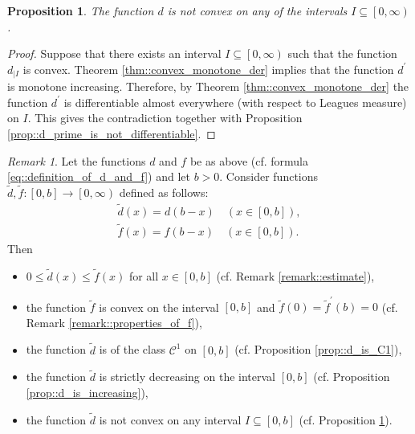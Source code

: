 \documentclass[12pt]{article}
\renewcommand{\leq}{\leqslant}
\newcommand{\ContClass}{\mathcal{C}}
\newcommand{\paren}[1]{\! \left( #1 \right) }
\newcommand{\bracket}[1]{\! \left[ #1 \right] }  %
\newcommand{\displayendfileinfo}{}
\theoremstyle{plain}
\newtheorem{proposition}[theorem]{Proposition}
\theoremstyle{definition}
\theoremstyle{remark}
\newtheorem{remark}[theorem]{Remark}
\begin{document}
\begin{proposition} \label{d_is_non_convex_on_any_interval}
    The function $d$ is not convex on any of the intervals $I \subseteq \left[0, \infty \right)$.
\end{proposition}
\begin{proof}
    Suppose that there exists an interval $I \subseteq \left[0, \infty \right)$ such that the function $d_{|I}$ is convex.
    Theorem \ref{thm::convex_monotone_der} implies that the function $d^\prime$ is monotone increasing.
    Therefore, by Theorem \ref{thm::convex_monotone_der} the function $d^\prime$ is differentiable almost everywhere (with respect to Leagues measure) on $I$.
    This gives the contradiction together with Proposition \ref{prop::d_prime_is_not_differentiable}.
\end{proof}

\begin{remark}
    Let the functions $d$ and $f$ be as above (cf. formula \eqref{eq::definition_of_d_and_f}) and let $b>0$.
    Consider functions $\widetilde{d}, \widetilde{f} \colon \bracket{0, b} \to \left[0, \infty \right)$ defined as follows:
    \begin{align*}
        \widetilde{d}\paren{x} = d\paren{b-x} \quad \paren{x \in \bracket{0, b}}, \\
        \widetilde{f}\paren{x} = f\paren{b-x} \quad \paren{x \in \bracket{0, b}}.
    \end{align*}
    Then
    \begin{itemize}
        \item $0 \leq \widetilde{d}\paren{x} \leq \widetilde{f}\paren{x}$ for all $x \in \bracket{0, b}$ (cf. Remark \ref{remark::estimate}),
        \item the function $\widetilde{f}$ is convex on the interval $\bracket{0, b}$ and $\widetilde{f}\paren{0} = \widetilde{f}^\prime\paren{b} = 0$ (cf. Remark \ref{remark::properties_of_f}),
        \item the function $\widetilde{d}$ is of the class $\ContClass^1$ on $\bracket{0, b}$ (cf. Proposition \ref{prop::d_is_C1}),
        \item the function $\widetilde{d}$ is strictly decreasing on the interval $\bracket{0, b}$ (cf. Proposition \ref{prop::d_is_increasing}),
        \item the function $\widetilde{d}$ is not convex on any interval $I \subseteq \bracket{0, b}$ (cf. Proposition \ref{d_is_non_convex_on_any_interval}).
    \end{itemize} 
\end{remark}

{}


\displayendfileinfo
\end{document}
